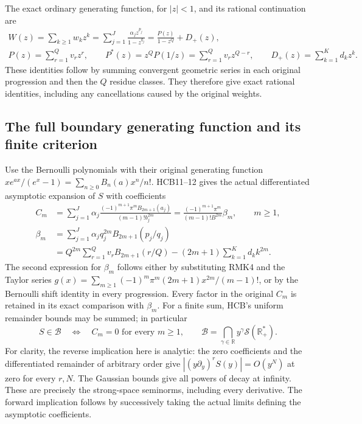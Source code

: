 The exact ordinary generating function, for $|z|<1$, and its rational
continuation are
\begin{equation}\tag{RMK5}
\begin{gathered}
 W(z)=\sum_{k\geq1}w_kz^k
     =\sum_{j=1}^J\frac{\alpha_jz^{p_j}}{1-z^{q_j}}
     =\frac{P(z)}{1-z^Q}+D_+(z),\\
 P(z)=\sum_{r=1}^Qv_r z^r,\qquad
 P^*(z)=z^QP(1/z)=\sum_{r=1}^Qv_r z^{Q-r},\qquad
 D_+(z)=\sum_{k=1}^K d_kz^k.
\end{gathered}
\end{equation}
These identities follow by summing convergent geometric series in
each original progression and then the $Q$ residue classes. They
therefore give exact rational identities, including any cancellations
caused by the original weights.

\subsection{The full boundary generating function and its finite criterion}

Use the Bernoulli polynomials with their original generating function
$xe^{a x}/(e^x-1)=\sum_{n\geq0}B_n(a)x^n/n!$. HCB11--12 gives
the actual differentiated asymptotic expansion of $S$ with coefficients
\begin{equation}\tag{RMK6}
\begin{split}
 C_m&=\sum_{j=1}^J\alpha_j
   \frac{(-1)^{m+1}\pi^mB_{2m+1}(a_j)}{(m-1)!b_j^{2m}}
    =\frac{(-1)^{m+1}\pi^m}{(m-1)!B^{2m}}\beta_m,
       \qquad m\geq1,\\
 \beta_m&=\sum_{j=1}^J\alpha_jq_j^{2m}B_{2m+1}(p_j/q_j)\\
 &=Q^{2m}\sum_{r=1}^Qv_r B_{2m+1}(r/Q)
        -(2m+1)\sum_{k=1}^K d_k k^{2m}.
\end{split}
\end{equation}
The second expression for $\beta_m$ follows either by substituting
RMK4 and the Taylor series
$g(x)=\sum_{m\geq1}(-1)^m\pi^m(2m+1)x^{2m}/(m-1)!$, or by the
Bernoulli shift identity in every progression. Every factor in the
original $C_m$ is retained in its exact comparison with $\beta_m$.
For a finite sum, HCB's uniform remainder bounds may be summed;
in particular
\begin{equation}\tag{RMK7}
 S\in\mathcal B
 \quad\Longleftrightarrow\quad C_m=0\text{ for every }m\geq1,
 \qquad
 \mathcal B=\bigcap_{\gamma\in\mathbb R}y^\gamma
                    \mathcal S(\mathbb R_+^*).
\end{equation}
For clarity, the reverse implication here is analytic: the zero
coefficients and the differentiated remainder of arbitrary order
give $|(y\partial_y)^rS(y)|=O(y^N)$ at zero for every $r,N$.
The Gaussian bounds give all powers of decay at infinity. These
are precisely the strong-space seminorms, including every derivative.
The forward implication follows by successively taking the actual
limits defining the asymptotic coefficients.

